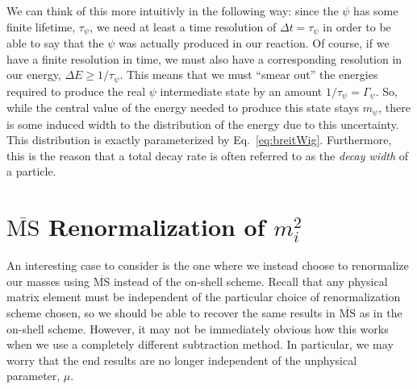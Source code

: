 \documentclass{article}
\numberwithin{equation}{subsection}
\begin{document}
We can think of this more intuitivly in the following way: since the $\psi$ has some finite lifetime, $\tau_\psi$, we need at least
a time resolution of $\Delta t = \tau_\psi$ in order to be able to say that the $\psi$ was actually produced in our reaction. Of
course, if we have a finite resolution in time, we must also have a corresponding resolution in our energy, $\Delta E \ge 1/\tau_\psi$.
This means that we must ``smear out'' the energies required to produce the real $\psi$ intermediate state by an amount
$1/\tau_\psi = \Gamma_\psi$. So, while the central value of the energy needed to produce this state stays $m_\psi$, there is some
induced width to the distribution of the energy due to this uncertainty. This distribution is exactly parameterized by Eq.~\eqref{eq:breitWig}.
Furthermore, this is the reason that a total decay rate is often referred to as the \textit{decay width} of a particle.

\appendix

\section{$\overline{\text{MS}}$ Renormalization of $m_i^2$}

An interesting case to consider is the one where we instead choose to renormalize our masses using $\overline{\text{MS}}$ instead of the on-shell scheme. 
Recall that any physical matrix element must be independent of the particular choice of renormalization scheme chosen, so we should be able to recover the same results in 
$\overline{\text{MS}}$ as in the on-shell scheme. However, it may not be immediately obvious how this works when we use a completely different subtraction method. In particular, we may worry 
that the end results are no longer independent of the unphysical parameter, $\mu$.
\end{document}
